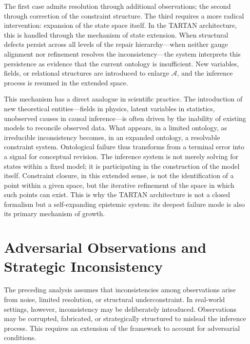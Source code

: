 \documentclass[11pt, oneside]{article}
\begin{document}
The first case admits resolution through additional observations; the second through correction of the constraint structure. The third requires a more radical intervention: expansion of the state space itself. In the TARTAN architecture, this is handled through the mechanism of state extension. When structural defects persist across all levels of the repair hierarchy---when neither gauge alignment nor refinement resolves the inconsistency---the system interprets this persistence as evidence that the current ontology is insufficient. New variables, fields, or relational structures are introduced to enlarge $\mathcal{A}$, and the inference process is resumed in the extended space.

This mechanism has a direct analogue in scientific practice. The introduction of new theoretical entities---fields in physics, latent variables in statistics, unobserved causes in causal inference---is often driven by the inability of existing models to reconcile observed data. What appears, in a limited ontology, as irreducible inconsistency becomes, in an expanded ontology, a resolvable constraint system. Ontological failure thus transforms from a terminal error into a signal for conceptual revision. The inference system is not merely solving for states within a fixed model; it is participating in the construction of the model itself. Constraint closure, in this extended sense, is not the identification of a point within a given space, but the iterative refinement of the space in which such points can exist. This is why the TARTAN architecture is not a closed formalism but a self-expanding epistemic system: its deepest failure mode is also its primary mechanism of growth.

\section{Adversarial Observations and Strategic Inconsistency}

The preceding analysis assumes that inconsistencies among observations arise from noise, limited resolution, or structural underconstraint. In real-world settings, however, inconsistency may be deliberately introduced. Observations may be corrupted, fabricated, or strategically structured to mislead the inference process. This requires an extension of the framework to account for adversarial conditions.
\end{document}
